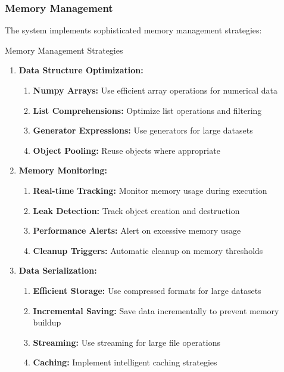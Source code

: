 \documentclass[12pt,a4paper]{article}
\begin{document}
\subsubsection{Memory Management}

The system implements sophisticated memory management strategies:

\begin{algorithm}
\caption{Memory Management Strategies}
\begin{enumerate}
    \item \textbf{Data Structure Optimization:}
    \begin{enumerate}
        \item \textbf{Numpy Arrays:} Use efficient array operations for numerical data
        \item \textbf{List Comprehensions:} Optimize list operations and filtering
        \item \textbf{Generator Expressions:} Use generators for large datasets
        \item \textbf{Object Pooling:} Reuse objects where appropriate
    \end{enumerate}
    \item \textbf{Memory Monitoring:}
    \begin{enumerate}
        \item \textbf{Real-time Tracking:} Monitor memory usage during execution
        \item \textbf{Leak Detection:} Track object creation and destruction
        \item \textbf{Performance Alerts:} Alert on excessive memory usage
        \item \textbf{Cleanup Triggers:} Automatic cleanup on memory thresholds
    \end{enumerate}
    \item \textbf{Data Serialization:}
    \begin{enumerate}
        \item \textbf{Efficient Storage:} Use compressed formats for large datasets
        \item \textbf{Incremental Saving:} Save data incrementally to prevent memory buildup
        \item \textbf{Streaming:} Use streaming for large file operations
        \item \textbf{Caching:} Implement intelligent caching strategies
    \end{enumerate}
\end{enumerate}
\end{algorithm}
\end{document}
